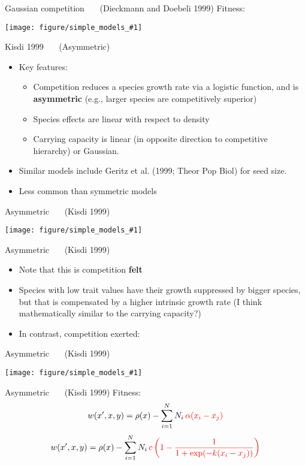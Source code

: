 \documentclass[12pt]{beamer}
\newcommand{\wikipic}[1]{%
\begin{center}%
\texttt{[image: figure/simple\_models\_\#1]}%
\end{center}}
\newcommand{\subt}[1]{{~~~\normalsize (#1)}}
\begin{document}
\begin{frame}[t]{Gaussian competition \subt{Dieckmann and Doebeli 1999}}
  Fitness:
  \wikipic{dieckmann__dd_fitness_landscape}
\end{frame}

\begin{frame}[t]{Kisdi 1999 \subt{Asymmetric}}
  \begin{itemize}
    \item Key features:
      \begin{itemize}
      \item Competition reduces a species growth rate via a logistic
        function, and is \textbf{asymmetric} (e.g., larger species are
        competitively superior)
      \item Species effects are linear with respect to density
      \item Carrying capacity is linear (in opposite direction to
        competitive hierarchy) or Gaussian.
      \end{itemize}
    \item Similar models include Geritz et al. (1999; Theor Pop Biol)
      for seed size.
    \item Less common than symmetric models
  \end{itemize}
\end{frame}

\begin{frame}[t]{Asymmetric \subt{Kisdi 1999}}
  \wikipic{kisdi__k_competition_felt}
\end{frame}

\begin{frame}[t]{Asymmetric \subt{Kisdi 1999}}
  \begin{itemize}
  \item Note that this is competition \textbf{felt}
  \item Species with low trait values have their growth suppressed by
    bigger species, but that is compensated by a higher intrinsic
    growth rate (I think mathematically similar to the carrying
    capacity?)
  \item In contrast, competition exerted:
  \end{itemize}
\end{frame}

\begin{frame}[t]{Asymmetric \subt{Kisdi 1999}}
  \wikipic{kisdi__k_competition_true}
\end{frame}

\begin{frame}[t]{Asymmetric \subt{Kisdi 1999}}
  Fitness:
  \begin{displaymath}
      w(x^\prime, x, y) = 
      \rho(x) - 
        \sum_{i=1}^N N_i \,
        {\color{red}\alpha(x_i - x_j)}
  \end{displaymath}
  \begin{displaymath}
      w(x^\prime, x, y) = 
      \rho(x) - 
        \sum_{i=1}^N N_i \,
        {\color{red}c\left(
            1 - \frac{1}{1 + \exp(-k(x_i - x_j))}
            \right)}
  \end{displaymath}
\end{frame}
\end{document}
